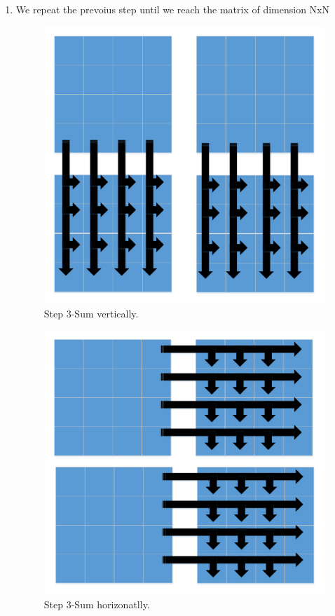 \begin{enumerate}
   
   \item We repeat the prevoius step until we reach the matrix of dimension NxN
    \begin{figure}[h]
    	\centering	
    	\includegraphics[scale=0.40]{imm/iia/iia_step3a}  
    	\caption{Step 3-Sum vertically.}
    	\label{fig:IIA3a}
    \end{figure}
    
    \begin{figure}[h]
    	\centering
    	\includegraphics[scale=0.40]{imm/iia/iia_step3b}  
    	\caption{Step 3-Sum horizonatlly.} 
    	\label{fig:IIA3b}
    \end{figure}
     \end{enumerate}
     \clearpage
